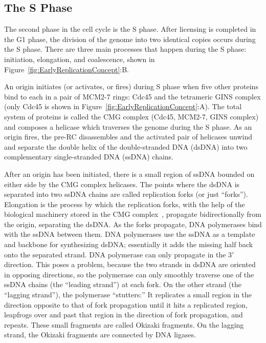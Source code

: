 		
		\subsection{The S Phase}
		\label{subsec:SPhase}
		
		The second phase in the cell cycle is the S phase.
		After licensing is completed in the G1 phase, the division of the genome into two identical copies occurs during the S phase.
		There are three main processes that happen during the S phase: initiation, elongation, and coalescence, shown in Figure~\ref{fig:EarlyReplicationConcept}:B.
		
		An origin initiates (or activates, or fires) during S phase when five other proteins bind to each in a pair of MCM2-7 rings:
		Cdc45 and the tetrameric GINS complex (only Cdc45 is shown in Figure~\ref{fig:EarlyReplicationConcept}:A).
		The total system of proteins is called the CMG complex (Cdc45, MCM2-7, GINS complex) and composes a helicase which traverses the genome during the S phase.
		As an origin fires, the pre-RC disassembles and the activated pair of helicases unwind and separate the double helix of the double-stranded DNA (dsDNA) into two complementary single-stranded DNA (ssDNA) chains.~\cite{GINSComplex}
		
		After an origin has been initiated, there is a small region of ssDNA bounded on either side by the CMG complex helicases.
		The points where the dsDNA is separated into two ssDNA chains are called replication forks (or just ``forks'').
		Elongation is the process by which the replication forks, with the help of the biological machinery stored in the CMG complex~\cite{PurifiedProteins}, propagate bidirectionally from the origin, separating the dsDNA.
		As the forks propagate, DNA polymerases bind with the ssDNA between them.
		DNA polymerases use the ssDNA as a template and backbone for synthesizing dsDNA; essentially it adds the missing half back onto the separated strand.
		DNA polymerase can only propagate in the $3'$ direction.
		This poses a problem, because the two strands in dsDNA are oriented in opposing directions, so the polymerase can only smoothly traverse one of the ssDNA chains (the ``leading strand'') at each fork.
		On the other strand (the ``lagging strand''), the polymerase ``stutters:''
		It replicates a small region in the direction opposite to that of fork propagation until it hits a replicated region, leapfrogs over and past that region in the direction of fork propagation, and repeats.
		These small fragments are called Okizaki fragments.
		On the lagging strand, the Okizaki fragments are connected by DNA ligases.~\cite{MolecularCellBiology, CellMolApproach, OriginsReview}
		

